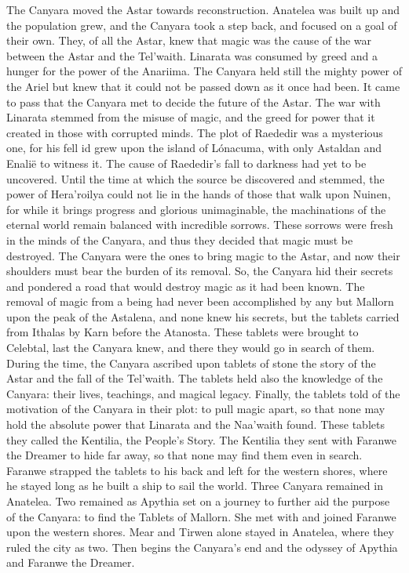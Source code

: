 \documentclass[smalldemyvopaper,11pt,twoside,onecolumn,openright,extrafontsizes]{memoir}
\begin{document}
	The Canyara moved the Astar towards reconstruction. Anatelea was built up and the population grew, and the Canyara took a step back, and focused on a goal of their own. They, of all the Astar, knew that magic was the cause of the war between the Astar and the Tel'waith. Linarata was consumed by greed and a hunger for the power of the Anariima. The Canyara held still the mighty power of the Ariel but knew that it could not be passed down as it once had been.
	It came to pass that the Canyara met to decide the future of the Astar. The war with Linarata stemmed from the misuse of magic, and the greed for power that it created in those with corrupted minds. The plot of Raededir was a mysterious one, for his fell id grew upon the island of Lónacuma, with only Astaldan and Enalië to witness it. The cause of Raededir’s fall to darkness had yet to be uncovered. Until the time at which the source be discovered and stemmed, the power of Hera’roilya could not lie in the hands of those that walk upon Nuinen, for while it brings progress and glorious unimaginable, the machinations of the eternal world remain balanced with incredible sorrows. These sorrows were fresh in the minds of the Canyara, and thus they decided that magic must be destroyed. The Canyara were the ones to bring magic to the Astar, and now their shoulders must bear the burden of its removal.
So, the Canyara hid their secrets and pondered a road that would destroy magic as it had been known. The removal of magic from a being had never been accomplished by any but Mallorn upon the peak of the Astalena, and none knew his secrets, but the tablets carried from Ithalas by Karn before the Atanosta. These tablets were brought to Celebtal, last the Canyara knew, and there they would go in search of them. During the time, the Canyara ascribed upon tablets of stone the story of the Astar and the fall of the Tel’waith. The tablets held also the knowledge of the Canyara: their lives, teachings, and magical legacy. Finally, the tablets told of the motivation of the Canyara in their plot: to pull magic apart, so that none may hold the absolute power that Linarata and the Naa’waith found. These tablets they called the Kentilia, the People’s Story.
The Kentilia they sent with Faranwe the Dreamer to hide far away, so that none may find them even in search. Faranwe strapped the tablets to his back and left for the western shores, where he stayed long as he built a ship to sail the world.
Three Canyara remained in Anatelea. Two remained as Apythia set on a journey to further aid the purpose of the Canyara: to find the Tablets of Mallorn. She met with and joined Faranwe upon the western shores. Mear and Tirwen alone stayed in Anatelea, where they ruled the city as two. Then begins the Canyara’s end and the odyssey of Apythia and Faranwe the Dreamer. 
\end{document}
